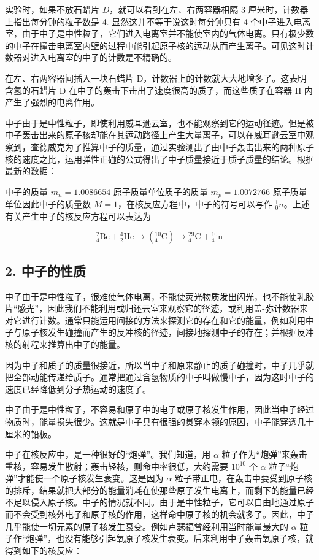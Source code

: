 实验时，如果不放石蜡片 \(D\)，就可以看到在左、右两容器相隔 3
厘米时，计数器上指出每分钟的粒子数是 4. 显然这并不等于说这时每分钟只有 4
个中子进入电离室，由于中子是中性粒子，它们进入电离室并不能使室内的气体电离。只有极少数的中子在撞击电离室内壁的过程中能引起原子核的运动从而产生离子。可见这时计数器对进入电离室的中子的计数是不精确的。

在左、右两容器间插入一块石蜡片
D，计数器上的计数就大大地增多了。这表明含氢的石蜡片 D
在中子的轰击下击出了速度很高的质子，而这些质子在容器 II
内产生了强烈的电离作用。

中子由于是中性粒子，即使利用威耳逊云室，也不能观察到它的运动径迹。但是被中子轰击出来的原子核却能在其运动路径上产生大量离子，可以在威耳逊云室中观察到，查德威克为了推算中子的质量，通过实验测出了由中子轰击出来的两种原子核的速度之比，运用弹性正碰的公式得出了中子质量接近于质子质量的结论。根据最新的数据：

中子的质量 \(m_{n}=1.0086654\) 原子质量单位质子的质量
\(m_{p}=1.0072766\) 原子质量单位因此中子的质量数
\(M = 1\)，在核反应方程中，中子的符号可以写作
\({}^{1}_{0}n\)。上述有关产生中子的核反应方程可以表达为

\[
{ } _ { 4 } ^ { 2 } \mathrm{Be} + { } _ { 2 } ^ { 4 } \mathrm{He} \longrightarrow ( { } _ { 4 } ^ { 10 } \mathrm{C} ) \longrightarrow { } _ { 4 } ^ { 29 } \mathrm{C} + { } _ { 4 } ^ { 10 } \mathrm{n}
\]

\subsection{2. 中子的性质}

中子由于是中性粒子，很难使气体电离，不能使荧光物质发出闪光，也不能使乳胶片``感光''，因此我们不能利用或归还云室来观察它的径迹，或利用盖-弥计数器来对它进行计数。通常只能运用间接的方法来探测它的存在和它的能量，例如利用中子与原子核发生碰撞而产生的反冲核的径迹，间接地探测中子的存在；并根据反冲核的射程来推算出中子的能量。

因为中子和质子的质量很接近，所以当中子和原来静止的质子碰撞时，中子几乎就把全部动能传递给质子。通常把通过含氢物质的中子叫做慢中子，因为这时中子的速度已经降低到分子热运动的速度了。

中子由于是中性粒子，不容易和原子中的电子或原子核发生作用，因此当中子经过物质时，能量损失很少。这就是中子具有很强的贯穿本领的原因，中子能穿透几十厘米的铅板。

中子在核反应中，是一种很好的``炮弹''。我们知道，用 \(\alpha\)
粒子作为``炮弹''来轰击重核，容易发生散射；轰击轻核，则命中率很低，大约需要
\(10^{10}\) 个 \(\alpha\) 粒子``炮弹''才能使一个原子核发生衰变。这是因为
\(\alpha\)
粒子带正电，在轰击中要受到原子核的排斥，结果就把大部分的能量消耗在使那些原子发生电离上，而剩下的能量已经不足以侵入原子核。中子的情况就不同。由于是中性粒子，它可以自由地通过原子而不会受到核外电子和原子核的作用，这样命中原子核的机会就多了。因此，中子几乎能使一切元素的原子核发生衰变。例如卢瑟福曾经利用当时能量最大的
\(\alpha\)
粒子作``炮弹''，也没有能够引起氧原子核发生衰变。后来利用中子轰击氧原子核，就得到如下的核反应：

